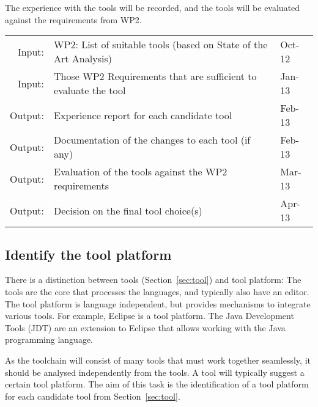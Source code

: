 \documentclass[11pt, a4paper]{article}
\let\oldmarginpar\marginpar
\renewcommand\marginpar[1]{\-\oldmarginpar[\raggedleft\scriptsize #1]%
{\raggedright\scriptsize #1}}
\newenvironment{inoutput}
{\vspace{2mm}
\noindent
\begin{tabular}{|r|p{.68\linewidth}|l|}
\hline}
{
\hline
\end{tabular}}
\begin{document}
The experience with the tools will be recorded, and the tools will be
evaluated against the requirements from WP2.

\begin{inoutput}
Input: & WP2: List of suitable tools (based on State of the Art Analysis) & Oct-12 \\
Input: & Those WP2 Requirements that are sufficient to evaluate the tool & Jan-13 \\
\hline
Output: & Experience report for each candidate tool & Feb-13 \\
Output: & Documentation of the changes to each tool (if any) & Feb-13 \\
Output: & Evaluation of the tools against the WP2 requirements & Mar-13 \\
Output: & Decision on the final tool choice(s) & Apr-13 \\
\end{inoutput}



\subsection{Identify the tool platform}
\label{sec:tool_platform}

There is a distinction between tools (Section~\ref{sec:tool}) and tool
platform: The tools are the core that processes the languages, and
typically also have an editor. The tool platform is language
independent, but provides mechanisms to integrate various tools. For
example, Eclipse is a tool platform. The Java Development Tools (JDT)
are an extension to Eclipse that allows working with the Java
programming language.

As the toolchain will consist of many tools that must work together
seamlessly, it should be analysed independently from the tools. A tool
will typically suggest a certain tool platform. The aim of this task
is the identification of a tool platform for each candidate tool from
Section~\ref{sec:tool}.
\end{document}

